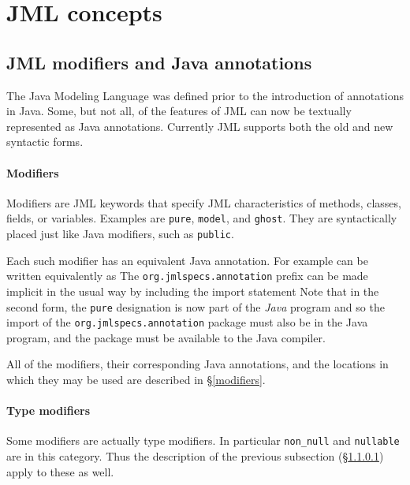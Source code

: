 \chapter{JML concepts}

\section{JML modifiers and Java annotations}

The Java Modeling Language was defined prior to the introduction of annotations in Java. Some, but not all, of the features of JML can now be textually represented as Java annotations. Currently JML supports both the old and new syntactic forms.

\subsubsection{Modifiers}
\label{Modifiers}

Modifiers are JML keywords that specify JML characteristics of methods, classes, fields, or variables. Examples are \texttt{pure}, \texttt{model}, and \texttt{ghost}. They are syntactically placed just like Java modifiers, such as \texttt{public}.

Each such modifier has an equivalent Java annotation. For example
can be written equivalently as 
The \texttt{org.jmlspecs.annotation} prefix can be made implicit in the usual way by including the import statement
Note that in the second form, the \texttt{pure} designation is now part of the \textit{Java} program and so the import of the
\texttt{org.jmlspecs.annotation} package must also be in the Java program, and the package must be available to the Java compiler.

All of the modifiers, their corresponding Java annotations, and the locations in which they may be used are described in \S\ref{modifiers}.

\subsubsection{Type modifiers}
Some modifiers are actually type modifiers. In particular \texttt{non\_null} and \texttt{nullable} are in this category. Thus the 
description of the previous subsection (\S\ref{Modifiers}) apply to these as well.

